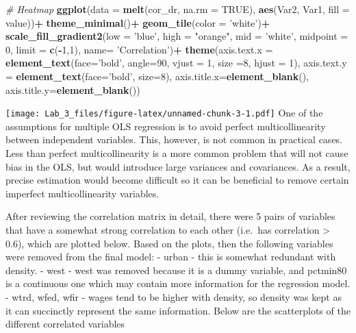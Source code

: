 \documentclass[]{article}
\newenvironment{Shaded}{\begin{snugshade}}{\end{snugshade}}
\newcommand{\KeywordTok}[1]{\textcolor[rgb]{0.13,0.29,0.53}{\textbf{#1}}}
\newcommand{\DataTypeTok}[1]{\textcolor[rgb]{0.13,0.29,0.53}{#1}}
\newcommand{\DecValTok}[1]{\textcolor[rgb]{0.00,0.00,0.81}{#1}}
\newcommand{\StringTok}[1]{\textcolor[rgb]{0.31,0.60,0.02}{#1}}
\newcommand{\CommentTok}[1]{\textcolor[rgb]{0.56,0.35,0.01}{\textit{#1}}}
\newcommand{\OtherTok}[1]{\textcolor[rgb]{0.56,0.35,0.01}{#1}}
\newcommand{\OperatorTok}[1]{\textcolor[rgb]{0.81,0.36,0.00}{\textbf{#1}}}
\newcommand{\NormalTok}[1]{#1}
\begin{document}
\begin{Shaded}
\begin{Highlighting}[]
\CommentTok{# Heatmap}
\KeywordTok{ggplot}\NormalTok{(}\DataTypeTok{data =} \KeywordTok{melt}\NormalTok{(cor_dr, }\DataTypeTok{na.rm =} \OtherTok{TRUE}\NormalTok{),}
       \KeywordTok{aes}\NormalTok{(Var2, Var1, }\DataTypeTok{fill =}\NormalTok{ value))}\OperatorTok{+}
\KeywordTok{theme_minimal}\NormalTok{()}\OperatorTok{+}\StringTok{ }
\KeywordTok{geom_tile}\NormalTok{(}\DataTypeTok{color =} \StringTok{'white'}\NormalTok{)}\OperatorTok{+}
\KeywordTok{scale_fill_gradient2}\NormalTok{(}\DataTypeTok{low =} \StringTok{'blue'}\NormalTok{,}
                     \DataTypeTok{high =} \StringTok{"orange"}\NormalTok{,}
                     \DataTypeTok{mid =} \StringTok{'white'}\NormalTok{, }
                     \DataTypeTok{midpoint =} \DecValTok{0}\NormalTok{,}
                     \DataTypeTok{limit =} \KeywordTok{c}\NormalTok{(}\OperatorTok{-}\DecValTok{1}\NormalTok{,}\DecValTok{1}\NormalTok{),}
                     \DataTypeTok{name=} \StringTok{'Correlation'}\NormalTok{)}\OperatorTok{+}
\KeywordTok{theme}\NormalTok{(}\DataTypeTok{axis.text.x =} \KeywordTok{element_text}\NormalTok{(}\DataTypeTok{face=}\StringTok{'bold'}\NormalTok{,}
                                 \DataTypeTok{angle=}\DecValTok{90}\NormalTok{,}
                                 \DataTypeTok{vjust =} \DecValTok{1}\NormalTok{,}
                                 \DataTypeTok{size =}\DecValTok{8}\NormalTok{,}
                                 \DataTypeTok{hjust =} \DecValTok{1}\NormalTok{),}
     \DataTypeTok{axis.text.y =} \KeywordTok{element_text}\NormalTok{(}\DataTypeTok{face=}\StringTok{'bold'}\NormalTok{,}
                                \DataTypeTok{size=}\DecValTok{8}\NormalTok{),}
     \DataTypeTok{axis.title.x=}\KeywordTok{element_blank}\NormalTok{(),}
     \DataTypeTok{axis.title.y=}\KeywordTok{element_blank}\NormalTok{())}
\end{Highlighting}
\end{Shaded}

\texttt{[image: Lab\_3\_files/figure-latex/unnamed-chunk-3-1.pdf]} One of
the assumptions for multiple OLS regression is to avoid perfect
multicollinearity between independent variables. This, however, is not
common in practical cases. Less than perfect multicollinearity is a more
common problem that will not cause bias in the OLS, but would introduce
large variances and covariances. As a result, precise estimation would
become difficult so it can be beneficial to remove certain imperfect
multicollinearity variables.

After reviewing the correlation matrix in detail, there were 5 pairs of
variables that have a somewhat strong correlation to each other
(i.e.~has correlation \textgreater{} 0.6), which are plotted below.
Based on the plots, then the following variables were removed from the
final model: - urban - this is somewhat redundant with density. - west -
west was removed because it is a dummy variable, and pctmin80 is a
continuous one which may contain more information for the regression
model. - wtrd, wfed, wfir - wages tend to be higher with density, so
density was kept as it can succinctly represent the same information.
Below are the scatterplots of the different correlated variables
\end{document}
